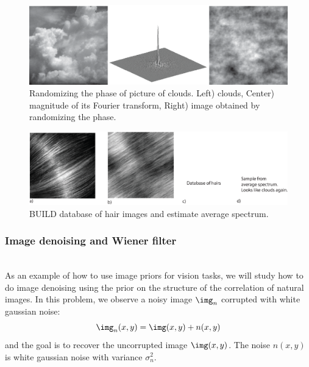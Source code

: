 \begin{figure}[htpb]
  \centerline{
    \includegraphics[width=1\linewidth]{figures/statistical_image_models/synthClouds.eps}
  }
  \caption{Randomizing the phase of picture of clouds. Left) clouds, Center) magnitude of its Fourier transform, Right) image obtained by randomizing the phase.}
  \label{fig:synthClouds}
\end{figure}



\begin{figure}[htpb]
  \centerline{
    \includegraphics[width=1\linewidth]{figures/statistical_image_models/examplefailurehair.eps}
  }
  \caption{BUILD database of hair images and estimate average spectrum.}
  \label{fig:hair}
\end{figure}


%
%
%

\subsubsection{Image denoising and Wiener filter}
~\\

As an example of how to use image priors for vision tasks, we will study how to do image denoising using the prior on the structure of the correlation of natural images. In this problem, we observe a noisy image $\img_n$ corrupted with white gaussian noise:
\begin{equation}
  \img_n(x,y) = \img(x,y) + n(x,y)
\end{equation}
and the goal is to recover the uncorrupted image $\img(x,y)$. The noise $n(x,y)$ is white gaussian noise with variance $\sigma_n^2$.

